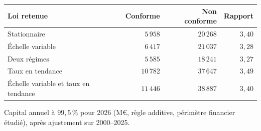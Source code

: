 \begin{center}\footnotesize
\renewcommand{\arraystretch}{1.15}
\begin{tabular}{@{}lrrr@{}}
\toprule
\textbf{Loi retenue} & \textbf{Conforme} & \textbf{Non conforme} & \textbf{Rapport} \\
\midrule
Stationnaire & $5\,958$ & $20\,268$ & $3{,}40$ \\
Échelle variable & $6\,417$ & $21\,037$ & $3{,}28$ \\
Deux régimes & $5\,585$ & $18\,241$ & $3{,}27$ \\
Taux en tendance & $10\,782$ & $37\,647$ & $3{,}49$ \\
Échelle variable et taux en tendance & $11\,446$ & $38\,887$ & $3{,}40$ \\
\bottomrule
\end{tabular}
\end{center}
\noindent Capital annuel à $99{,}5\,\%$ pour 2026 (M\euro, règle additive, périmètre financier étudié), après ajustement sur 2000--2025.
